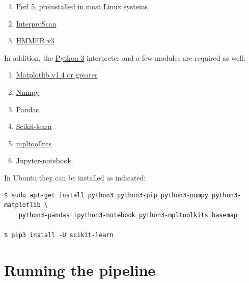 \documentclass[12pt]{report}
\begin{document}
\begin{enumerate}
\item{\href{https://www.perl.org}{Perl 5, preinstalled in most Linux systems}}
\item{\href{https://www.ebi.ac.uk/interpro/interproscan.htm}{InterproScan}}
\item{ \href{http://hmmer.org/}{HMMER v3}}
\end{enumerate}

In addition, the \href{https://www.python.org/downloads/}{Python 3} interpreter and a few modules are required as well:
\begin{enumerate}
\item{\href{http://matplotlib.org/users/installing.html#most-platforms-
scientific-python-distributions}{Matplotlib v1.4 or greater}}
\item{\href{https://docs.scipy.org/doc/numpy-1.10.0/user/install.html}{Numpy}}
\item{\href{http://pandas.pydata.org/pandas-docs/stable/install.html}{Pandas}}
\item{\href{http://scikit-learn.org/stable/install.html}{Scikit-learn}}
\item {\href{http://matplotlib.org/1.4.3/mpl_toolkits/index.html}{mpltoolkits}}
\item {\href{http://jupyter.org}{Jupyter-notebook}}
\end{enumerate}

In Ubuntu they can be installed as indicated:
\begin{verbatim}
$ sudo apt-get install python3 python3-pip python3-numpy python3-matplotlib \
	python3-pandas ipython3-notebook python3-mpltoolkits.basemap
    
$ pip3 install -U scikit-learn
\end{verbatim}


\chapter{Running the pipeline}
\end{document}
